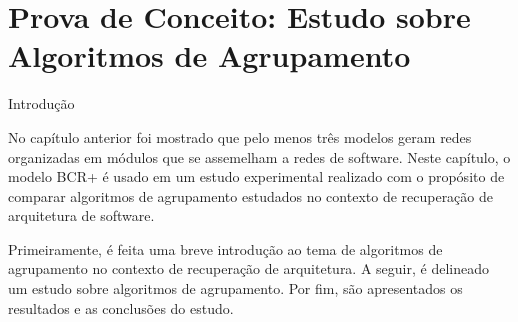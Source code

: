 
\chapter{Prova de Conceito: Estudo sobre Algoritmos de Agrupamento} \label{cap:estudo}


\begin{section}{Introdução}

No capítulo anterior foi mostrado que pelo menos três modelos geram redes organizadas em módulos que se assemelham a redes de software. Neste capítulo, o modelo BCR+ é usado em um estudo experimental realizado com o propósito de comparar algoritmos de agrupamento estudados no contexto de recuperação de arquitetura de software. 

Primeiramente, é feita uma breve introdução ao tema de algoritmos de agrupamento no contexto de recuperação de arquitetura. A seguir, é delineado um estudo sobre algoritmos de agrupamento. Por fim, são apresentados os resultados e as conclusões do estudo.

\end{section}

